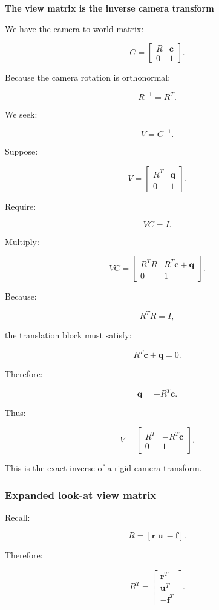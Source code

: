\textbf{The view matrix is the inverse camera transform}

We have the camera-to-world matrix:

\[
 C= \begin{bmatrix} R&\mathbf c\\ 0&1 \end{bmatrix}.
\]

Because the camera rotation is orthonormal:

\[
 R^{-1}=R^T.
\]

We seek:

\[
 V=C^{-1}.
\]

Suppose:

\[
 V= \begin{bmatrix} R^T&\mathbf q\\ 0&1 \end{bmatrix}.
\]

Require:

\[
 VC=I.
\]

Multiply:

\[
 VC= \begin{bmatrix} R^TR&R^T\mathbf c+\mathbf q\\ 0&1 \end{bmatrix}.
\]

Because:

\[
 R^TR=I,
\]

the translation block must satisfy:

\[
 R^T\mathbf c+\mathbf q=0.
\]

Therefore:

\[
 \mathbf q=-R^T\mathbf c.
\]

Thus:

\[
 \boxed{ V= \begin{bmatrix} R^T&-R^T\mathbf c\\ 0&1 \end{bmatrix} }.
\]

This is the exact inverse of a rigid camera transform.

\subsubsection{Expanded look-at view matrix}\label{02-foundations-ii-ch032-expanded-look-at-view-matrix}

Recall:

\[
 R=[\mathbf r\ \mathbf u\ -\mathbf f].
\]

Therefore:

\[
 R^T= \begin{bmatrix} \mathbf r^T\\ \mathbf u^T\\ -\mathbf f^T \end{bmatrix}.
\]

